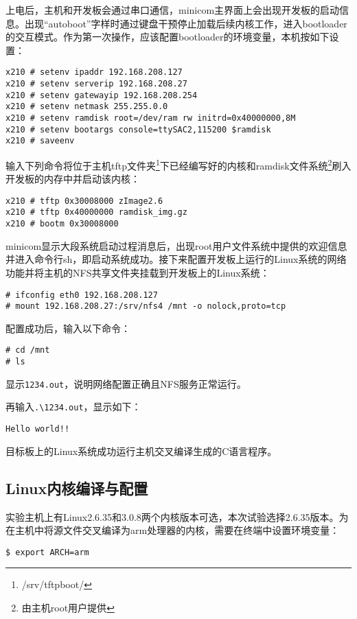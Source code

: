 \documentclass[hyperref,UTF8]{ctexart}
\begin{document}
上电后，主机和开发板会通过串口通信，minicom主界面上会出现开发板的启动信息。出现“autoboot”字样时通过键盘干预停止加载后续内核工作，进入bootloader的交互模式。作为第一次操作，应该配置bootloader的环境变量，本机按如下设置：
\begin{Verbatim}[frame=single]
x210 # setenv ipaddr 192.168.208.127
x210 # setenv serverip 192.168.208.27
x210 # setenv gatewayip 192.168.208.254
x210 # setenv netmask 255.255.0.0
x210 # setenv ramdisk root=/dev/ram rw initrd=0x40000000,8M
x210 # setenv bootargs console=ttySAC2,115200 $ramdisk
x210 # saveenv
\end{Verbatim}

输入下列命令将位于主机tftp文件夹\footnote{/srv/tftpboot/}下已经编写好的内核和ramdisk文件系统\footnote{由主机root用户提供}刷入开发板的内存中并启动该内核：\label{para:boot-test}
\begin{Verbatim}[frame=single]
x210 # tftp 0x30008000 zImage2.6
x210 # tftp 0x40000000 ramdisk_img.gz
x210 # bootm 0x30008000
\end{Verbatim}

minicom显示大段系统启动过程消息后，出现root用户文件系统中提供的欢迎信息并进入命令行sh，即启动系统成功。接下来配置开发板上运行的Linux系统的网络功能并将主机的NFS共享文件夹挂载到开发板上的Linux系统：
\begin{Verbatim}[frame=single]
# ifconfig eth0 192.168.208.127
# mount 192.168.208.27:/srv/nfs4 /mnt -o nolock,proto=tcp
\end{Verbatim}

配置成功后，输入以下命令：
\begin{Verbatim}[frame=single]
# cd /mnt
# ls
\end{Verbatim}
显示\verb"1234.out"，说明网络配置正确且NFS服务正常运行。

再输入\verb".\1234.out"，显示如下：
\begin{Verbatim}[frame=single]
Hello world!!
\end{Verbatim}
目标板上的Linux系统成功运行主机交叉编译生成的C语言程序。

\subsection{Linux内核编译与配置}\label{subsec:creat-kern}
实验主机上有Linux2.6.35和3.0.8两个内核版本可选，本次试验选择2.6.35版本。为在主机中将源文件交叉编译为arm处理器的内核，需要在终端中设置环境变量：\label{para:set-path}
\begin{Verbatim}[frame=single]
$ export ARCH=arm
\end{Verbatim}
\end{document}
